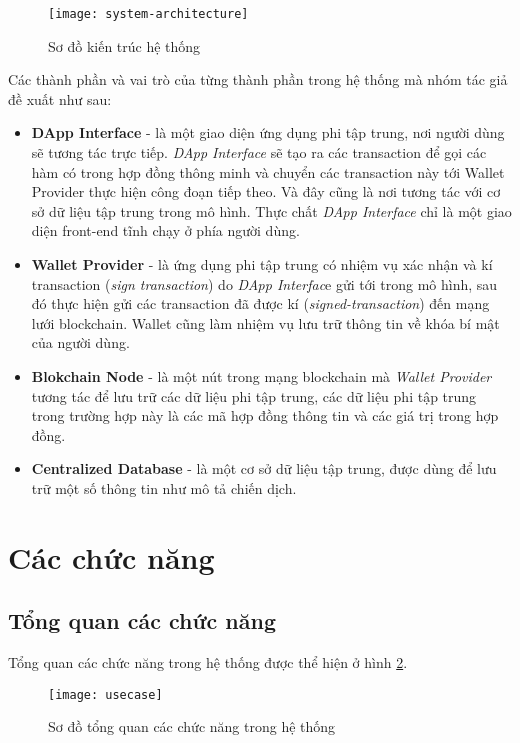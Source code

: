 \documentclass[../main-report.tex]{subfiles}
\begin{document}
\begin{figure}[ht!]
\begin{center}
\label{fig:system-architecture}
\texttt{[image: system-architecture]}
\caption{Sơ đồ kiến trúc hệ thống}
\end{center}
\end{figure}

Các thành phần và vai trò của từng thành phần trong hệ thống mà nhóm tác giả đề xuất như sau:

\begin{itemize}
\item \textbf{DApp Interface} - là một giao diện ứng dụng phi tập trung, nơi người dùng sẽ tương tác trực tiếp. \textit{DApp Interface} sẽ tạo ra các \gls{transaction} để gọi các hàm có trong hợp đồng thông minh và chuyển các \gls{transaction} này tới Wallet Provider thực hiện công đoạn tiếp theo. Và đây cũng là nơi tương tác với cơ sở dữ liệu tập trung trong mô hình. Thực chất \textit{DApp Interface} chỉ là một giao diện front-end tĩnh chạy ở phía người dùng.
\item \textbf{Wallet Provider} - là ứng dụng phi tập trung có nhiệm vụ xác nhận và kí transaction (\textit{sign transaction}) do \textit{DApp Interfac}e gửi tới trong mô hình, sau đó thực hiện gửi các \gls{transaction} đã được kí (\textit{signed-transaction}) đến mạng lưới \gls{blockchain}. Wallet cũng làm nhiệm vụ lưu trữ thông tin về khóa bí mật của người dùng.
\item \textbf{Blokchain Node} - là một nút trong mạng \gls{blockchain} mà \textit{Wallet Provider} tương tác để lưu trữ các dữ liệu phi tập trung, các dữ liệu phi tập trung trong trường hợp này là các mã hợp đồng thông tin và các giá trị trong hợp đồng.
\item \textbf{Centralized Database} - là một cơ sở dữ liệu tập trung, được dùng để lưu trữ một số thông tin như mô tả chiến dịch.
\end{itemize}

\section{Các chức năng}
\subsection{Tổng quan các chức năng}
Tổng quan các chức năng trong hệ thống được thể hiện ở hình \ref{fig:usecase-diagram}.

\begin{figure}[ht!]
\begin{center}
\label{fig:usecase-diagram}
\texttt{[image: usecase]}
\caption{Sơ đồ tổng quan các chức năng trong hệ thống}
\end{center}
\end{figure}
\end{document}
